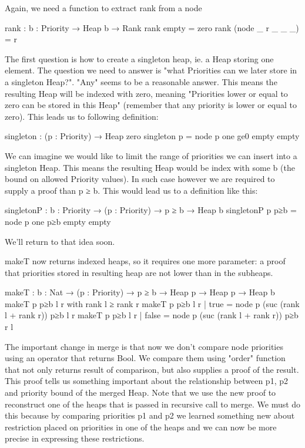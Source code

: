 Again, we need a function to extract rank from a node
\begin{code}
rank : {b : Priority} → Heap b → Rank
rank empty            = zero
rank (node _ r _ _ _) = r
\end{code}


The first question is how to create a singleton heap, ie. a Heap
storing one element. The question we need to answer is "what
Priorities can we later store in a singleton Heap?". "Any" seems to
be a reasonable answer. This means the resulting Heap will be
indexed with zero, meaning "Priorities lower or equal to zero can
be stored in this Heap" (remember that any priority is lower or
equal to zero). This leads us to following definition:
\begin{code}
singleton : (p : Priority) → Heap zero
singleton p = node p one ge0 empty empty
\end{code}


We can imagine we would like to limit the range of priorities we
can insert into a singleton Heap. This means the resulting Heap
would be index with some b (the bound on allowed Priority
values). In such case however we are required to supply a proof
than p ≥ b. This would lead us to a definition like this:

singletonP : {b : Priority} → (p : Priority) → p ≥ b → Heap b
singletonP p p≥b = node p one p≥b empty empty

We'll return to that idea soon.

makeT now returns indexed heaps, so it requires one more parameter:
a proof that priorities stored in resulting heap are not lower than
in the subheaps.
\begin{code}
makeT : {b : Nat} → (p : Priority) → p ≥ b → Heap p → Heap p → Heap b
makeT p p≥b l r with rank l ≥ rank r
makeT p p≥b l r | true  = node p (suc (rank l + rank r)) p≥b l r
makeT p p≥b l r | false = node p (suc (rank l + rank r)) p≥b r l
\end{code}


The important change in merge is that now we don't compare node
priorities using an operator that returns Bool. We compare them
using "order" function that not only returns result of comparison,
but also supplies a proof of the result. This proof tells us
something important about the relationship between p1, p2 and
priority bound of the merged Heap. Note that we use the new proof
to reconstruct one of the heaps that is passed in recursive call to
merge. We must do this because by comparing priorities p1 and p2 we
learned something new about restriction placed on priorities in one
of the heaps and we can now be more precise in expressing these
restrictions.

